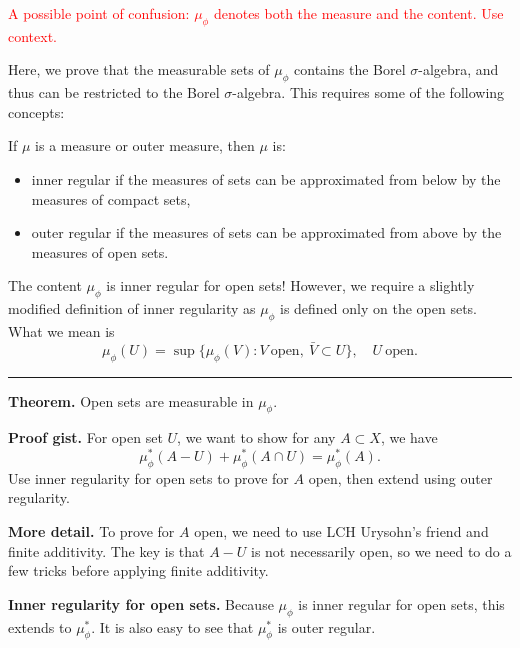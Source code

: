 \documentclass[12pt, letterpaper]{article}
\newcommand{\s}{\sigma}
\begin{document}
\pagestyle{fancy}
\textcolor{red}{A possible point of confusion: $\mu_\phi$ denotes both the measure and the content. Use context.}

Here, we prove that the measurable sets of $\mu_\phi$ contains the Borel $\s$-algebra, and thus can be restricted to the Borel $\s$-algebra. This requires some of the following concepts:

If $\mu$ is a measure or outer measure, then $\mu$ is:
\begin{itemize}
    \item inner regular if the measures of sets can be approximated from below by the measures of compact sets,
    \item outer regular if the measures of sets can be approximated from above by the measures of open sets.
\end{itemize}

The content $\mu_\phi$ is inner regular for open sets! However, we require a slightly modified definition of inner regularity as $\mu_\phi$ is defined only on the open sets. What we mean is
\[
    \mu_\phi(U) = \sup\{\mu_\phi(V): V \ \text{open}, \ \bar{V} \subset U\}, \quad U \ \text{open.}
\]

\noindent\rule{\textwidth}{1pt}

\textbf{Theorem.} Open sets are measurable in $\mu_\phi$.

\textbf{Proof gist.} For open set $U$, we want to show for any $A \subset X$, we have
\[
    \mu_\phi^*(A - U) + \mu_\phi^*(A \cap U) = \mu_\phi^*(A).
\]
Use inner regularity for open sets to prove for $A$ open, then extend using outer regularity.

\textbf{More detail.} To prove for $A$ open, we need to use LCH Urysohn's friend and finite additivity. The key is that $A - U$ is not necessarily open, so we need to do a few tricks before applying finite additivity.

\textbf{Inner regularity for open sets.} Because $\mu_\phi$ is inner regular for open sets, this extends to $\mu_\phi^*$. It is also easy to see that $\mu_\phi^*$ is outer regular.
\end{document}
